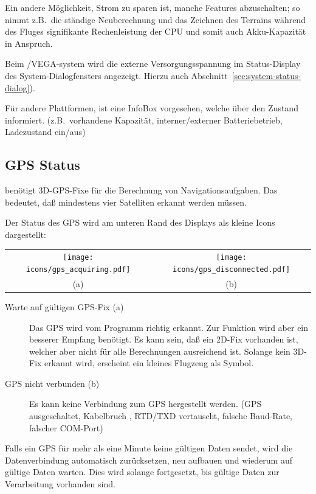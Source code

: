 Ein andere Möglichkeit, Strom zu sparen ist, manche Features abzuschalten; so nimmt z.B.\ die ständige Neuberechnung und das Zeichnen des Terrains während des Fluges signifikante Rechenleistung der CPU und somit auch Akku-Kapazität in Anspruch.

Beim \al/VEGA-system wird die externe Versorgungsspannung im Status-Display des System-Dialogfensters angezeigt.  Hierzu auch Abschnitt~\ref{sec:system-status-dialog}).

Für andere Plattformen, ist eine  InfoBox vorgesehen, welche über den Zustand informiert.
(z.B.\ vorhandene Kapazität, interner/externer Batteriebetrieb, Ladezustand ein/aus)

\subsection*{GPS Status}

\xc benötigt 3D-GPS-Fixe für die Berechnung von Navigationsaufgaben. Das bedeutet, daß mindestens vier Satelliten erkannt werden müssen.

Der Status des GPS wird am unteren Rand des Displays als kleine Icons dargestellt:

\begin{tabular}{c c}%
\texttt{[image: icons/gps\_acquiring.pdf]} & \texttt{[image: icons/gps\_disconnected.pdf]}\\
(a) & (b)
\end{tabular}

\begin{description}
\item[Warte auf gültigen GPS-Fix (a)]  Das GPS wird vom Programm richtig erkannt. Zur Funktion wird aber ein besserer Empfang benötigt. Es kann sein, daß ein 2D-Fix vorhanden ist, welcher aber nicht für alle Berechnungen ausreichend ist. Solange kein 3D-Fix erkannt wird, erscheint ein kleines Flugzeug als Symbol.

\item[GPS nicht verbunden (b)]  Es kann keine Verbindung zum GPS hergestellt werden.
 (GPS ausgeschaltet, Kabelbruch , RTD/TXD vertauscht, falsche Baud-Rate, falscher COM-Port)
\end{description}

Falls ein GPS für mehr als eine Minute keine gültigen Daten sendet, wird \xc die Datenverbindung automatisch zurücksetzen, neu aufbauen und wiederum auf gültige Daten warten. Dies wird solange fortgesetzt, bis gültige Daten zur Verarbeitung vorhanden sind.

